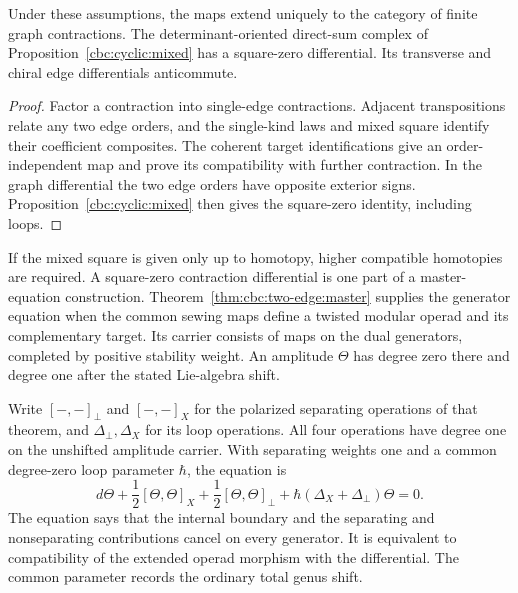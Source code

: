 \begin{recognition}\label{thm:two-edge-recognition}
Under these assumptions, the maps extend uniquely to the category of finite graph contractions.
The determinant-oriented direct-sum complex of Proposition~\ref{cbc:cyclic:mixed} has a square-zero differential.
Its transverse and chiral edge differentials anticommute.
\end{recognition}
\begin{proof}
Factor a contraction into single-edge contractions.
Adjacent transpositions relate any two edge orders, and the single-kind laws and mixed square identify their coefficient composites.
The coherent target identifications give an order-independent map and prove its compatibility with further contraction.
In the graph differential the two edge orders have opposite exterior signs.
Proposition~\ref{cbc:cyclic:mixed} then gives the square-zero identity, including loops.
\end{proof}

If the mixed square is given only up to homotopy, higher compatible homotopies are required.
A square-zero contraction differential is one part of a master-equation construction.
Theorem~\ref{thm:cbc:two-edge:master} supplies the generator equation when the common sewing maps define a twisted modular operad and its complementary target.
Its carrier consists of maps on the dual generators, completed by positive stability weight.
An amplitude $\Theta$ has degree zero there and degree one after the stated Lie-algebra shift.

Write $[-,-]_\perp$ and $[-,-]_X$ for the polarized separating operations of that theorem, and $\Delta_\perp,\Delta_X$ for its loop operations.
All four operations have degree one on the unshifted amplitude carrier.
With separating weights one and a common degree-zero loop parameter $\hbar$, the equation is
\begin{equation}\label{eq:cbc:physics:two-edge-master}
 d\Theta+\frac12[\Theta,\Theta]_X
 +\frac12[\Theta,\Theta]_\perp
 +\hbar(\Delta_X+\Delta_\perp)\Theta=0.
\end{equation}
The equation says that the internal boundary and the separating and nonseparating contributions cancel on every generator.
It is equivalent to compatibility of the extended operad morphism with the differential.
The common parameter records the ordinary total genus shift.

